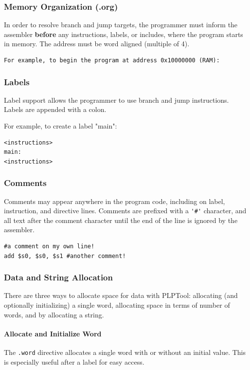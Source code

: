 \documentclass{article}
\begin{document}
\subsubsection{Memory Organization (.org)}
In order to resolve branch and jump targets, the programmer must inform the 
assembler \textbf{before} any instructions, labels, or includes, where the 
program starts in memory. The address must be word aligned (multiple of 4).

\begin{verbatim}
For example, to begin the program at address 0x10000000 (RAM): 
\end{verbatim}

\subsubsection{Labels}
Label support allows the programmer to use branch and jump instructions. Labels are appended with a colon.

For example, to create a label "main": 

\begin{verbatim}
<instructions>
main:
<instructions>
\end{verbatim}

\subsubsection{Comments}
Comments may appear anywhere in the program code, including on label, 
instruction, and directive lines. Comments are prefixed with a \verb+'#'+
character, and all text after the comment character until the end of the line is ignored by the assembler. 

\begin{verbatim}
#a comment on my own line!
add $s0, $s0, $s1 #another comment!
\end{verbatim}

\subsubsection{Data and String Allocation}
There are three ways to allocate space for data with PLPTool: allocating (and optionally initializing) a single word, allocating space in terms of number of words, and by allocating a string. 
\paragraph{Allocate and Initialize Word}
The \verb+.word+ directive allocates a single word with or without an initial 
value. This is especially useful after a label for easy access.
\end{document}
